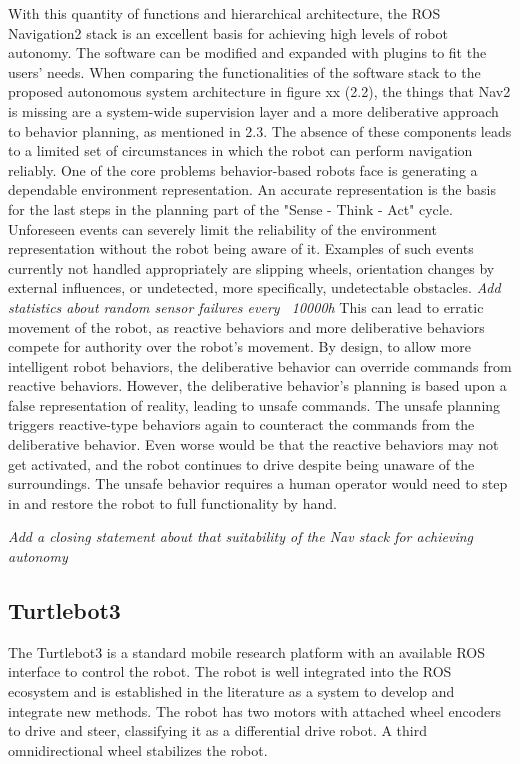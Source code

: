 With this quantity of functions and hierarchical architecture, the ROS Navigation2 stack is an excellent basis for achieving high levels of robot autonomy. The software can be modified and expanded with plugins to fit the users' needs. 
When comparing the functionalities of the software stack to the proposed autonomous system architecture in figure xx (2.2), the things that Nav2 is missing are a system-wide supervision layer and a more deliberative approach to behavior planning, as mentioned in 2.3.
The absence of these components leads to a limited set of circumstances in which the robot can perform navigation reliably. One of the core problems behavior-based robots face is generating a dependable environment representation. An accurate representation is the basis for the last steps in the planning part of the "Sense - Think - Act" cycle. Unforeseen events can severely limit the reliability of the environment representation without the robot being aware of it. Examples of such events currently not handled appropriately are slipping wheels, orientation changes by external influences, or undetected, more specifically, undetectable obstacles. \textit{Add statistics about random sensor failures every ~10000h} This can lead to erratic movement of the robot, as reactive behaviors and more deliberative behaviors compete for authority over the robot's movement. By design, to allow more intelligent robot behaviors, the deliberative behavior can override commands from reactive behaviors. However, the deliberative behavior's planning is based upon a false representation of reality, leading to unsafe commands. The unsafe planning triggers reactive-type behaviors again to counteract the commands from the deliberative behavior. Even worse would be that the reactive behaviors may not get activated, and the robot continues to drive despite being unaware of the surroundings. The unsafe behavior requires a human operator would need to step in and restore the robot to full functionality by hand. 

\textit{Add a closing statement about that suitability of the Nav stack for achieving autonomy}


\subsection{Turtlebot3}
The Turtlebot3 is a standard mobile research platform with an available ROS interface to control the robot. The robot is well integrated into the ROS ecosystem and is established in the literature as a system to develop and integrate new methods. 
The robot has two motors with attached wheel encoders to drive and steer, classifying it as a differential drive robot. A third omnidirectional wheel stabilizes the robot. 

